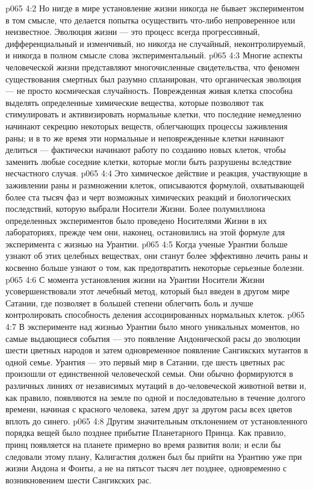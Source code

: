 \vs p065 4:2 Но нигде в мире установление жизни никогда не бывает экспериментом в том смысле, что делается попытка осуществить что\hyp{}либо непроверенное или неизвестное. Эволюция жизни --- это процесс всегда прогрессивный, дифференциальный и изменчивый, но никогда не случайный, неконтролируемый, и никогда в полном смысле слова экспериментальный.
\vs p065 4:3 \pc Многие аспекты человеческой жизни представляют многочисленные свидетельства, что феномен существования смертных был разумно спланирован, что органическая эволюция --- не просто космическая случайность. Поврежденная живая клетка способна выделять определенные химические вещества, которые позволяют так стимулировать и активизировать нормальные клетки, что последние немедленно начинают секрецию некоторых веществ, облегчающих процессы заживления раны; и в то же время эти нормальные и неповрежденные клетки начинают делиться --- фактически начинают работу по созданию новых клеток, чтобы заменить любые соседние клетки, которые могли быть разрушены вследствие несчастного случая.
\vs p065 4:4 Это химическое действие и реакция, участвующие в заживлении раны и размножении клеток, описываются формулой, охватывающей более ста тысяч фаз и черт возможных химических реакций и биологических последствий, которую выбрали Носители Жизни. Более полумиллиона определенных экспериментов было проведено Носителями Жизни в их лабораториях, прежде чем они, наконец, остановились на этой формуле для эксперимента с жизнью на Урантии.
\vs p065 4:5 Когда ученые Урантии больше узнают об этих целебных веществах, они станут более эффективно лечить раны и косвенно больше узнают о том, как предотвратить некоторые серьезные болезни.
\vs p065 4:6 С момента установления жизни на Урантии Носители Жизни усовершенствовали этот лечебный метод, который был введен в другом мире Сатании, где позволяет в большей степени облегчить боль и лучше контролировать способность деления ассоциированных нормальных клеток.
\vs p065 4:7 \pc В эксперименте над жизнью Урантии было много уникальных моментов, но самые выдающиеся события --- это появление Андонической расы до эволюции шести цветных народов и затем одновременное появление Сангикских мутантов в одной семье. Урантия --- это первый мир в Сатании, где шесть цветных рас произошли от единственной человеческой семьи. Они обычно формируются в различных линиях от независимых мутаций в до\hyp{}человеческой животной ветви и, как правило, появляются на земле по одной и последовательно в течение долгого времени, начиная с красного человека, затем друг за другом расы всех цветов вплоть до синего.
\vs p065 4:8 Другим значительным отклонением от установленного порядка вещей было позднее прибытие Планетарного Принца. Как правило, принц появляется на планете примерно во время развития воли; и если бы следовали этому плану, Калигастия должен был бы прийти на Урантию уже при жизни Андона и Фонты, а не на пятьсот тысяч лет позднее, одновременно с возникновением шести Сангикских рас.
